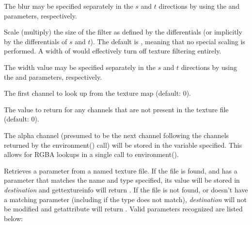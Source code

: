 \documentclass[11pt,letterpaper]{book}
\begin{document}
The blur may be specified separately in the $s$ and $t$ directions by
using the  and  parameters, respectively.
\apiend
\vspace{-16pt}

\vspace{12pt}
Scale (multiply) the size of the filter as defined by the differentials
(or implicitly by the differentials of $s$ and $t$).  The default is
{}, meaning that no special scaling is performed.  A width of
{} would effectively turn off texture filtering entirely.

The width value may be specified separately in the $s$ and $t$
directions by using the  and  parameters,
respectively.
\apiend
\vspace{-16pt}

\vspace{12pt}
The first channel to look up from the texture map (default: 0).
\apiend
\vspace{-16pt}

\vspace{12pt}
The value to return for any channels that are not present in the texture
file (default: 0).
\apiend
\vspace{-16pt}

\vspace{12pt}
The alpha channel (presumed to be the next channel following the
channels returned by the {\cf environment()} call) will be stored in the
variable specified.  This allows for RGBA lookups in a single call to
{\cf environment()}.
\apiend
\vspace{-16pt}

\apiend


\newpage
{}

Retrieves a parameter from a named texture file.  If the file is found,
and has a parameter that matches the name and type specified, its value
will be stored in \emph{destination} and {\cf gettextureinfo} will
return {}.  If the file is not found, or doesn't have a matching
parameter (including if the type does not match), \emph{destination}
will not be modified and {\cf getattribute} will return {}.  Valid
parameters recognized are listed below:
\end{document}
